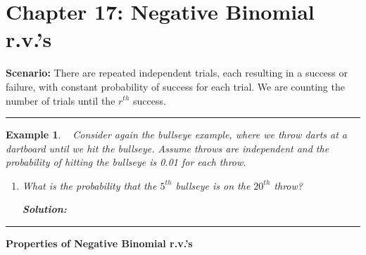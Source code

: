 \documentclass[12pt]{amsart}
\newtheorem{example}[theorem]{Example}
\begin{document}
\setcounter{section}{17}
{\huge  
\section*{Chapter 17: Negative Binomial r.v.'s}
}

{\large 




\vspace{.5cm}

\textbf{Scenario:} There are repeated independent trials, each resulting in a success or failure, with constant probability of success for each trial. We are counting the number of trials until the $r^{th}$ success.

\vspace{.5cm}
\hrule
\vspace{.5cm}


\begin{example}\ %
Consider again the bullseye example, where we throw darts at a dartboard until we hit the bullseye. Assume throws are independent and the probability of hitting the bullseye is 0.01 for each throw. 
\begin{enumerate}
\item What is the probability that the $5^{th}$ bullseye is on the $20^{th}$ throw?

\textbf{Solution:}
\end{enumerate}

\end{example}
\vspace{4cm}
\hrule
\vspace{.5cm}



\textbf{Properties of Negative Binomial r.v.'s}



}
\end{document}
